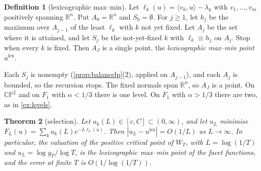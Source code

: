 \documentclass[11pt]{article}
\newtheorem{theorem}{Theorem}\newtheorem{proposition}[theorem]{Proposition}\newtheorem{lemma}[theorem]{Lemma}\newtheorem{corollary}[theorem]{Corollary}\newtheorem{conjecture}[theorem]{Conjecture}\crefname{conjecture}{Conjecture}{Conjectures}
\theoremstyle{definition}\newtheorem{definition}[theorem]{Definition}\newtheorem{remark}[theorem]{Remark}\newtheorem{example}[theorem]{Example}\newtheorem{problem}[theorem]{Open problem}\crefname{problem}{Problem}{Problems}
\newcommand{\R}{\mathbb R}
\begin{document}
\begin{definition}[lexicographic max--min]\label{def:lex}
Let $\ell_k(u)=\langle v_k,u\rangle-\lambda_k$ with $v_1,\dots,v_m$ positively spanning $\R^n$. Put $A_0=\R^n$ and $S_0=\emptyset$. For $j\ge1$, let $h_j$ be the maximum over $A_{j-1}$ of the least $\ell_k$ with $k$ not yet
fixed. Let $A_j$ be the set where it is attained, and let $S_j$ be the not-yet-fixed $k$ with $\ell_k\equiv h_j$ on $A_j$. Stop when every $k$ is fixed. Then $A_J$ is a single point, the
\emph{lexicographic max--min point} $u^{\mathrm{lex}}$.
\end{definition}

Each $S_j$ is nonempty (\cref{prop:balancelp}(2), applied on $A_{j-1}$), and each $A_j$ is bounded, so the recursion stops. The fixed normals span $\R^n$, so $A_J$ is a point. On $\mathbb{CP}^2$ and on $F_1$
with $\alpha<1/3$ there is one level. On $F_1$ with $\alpha>1/3$ there are two, as in \cref{ex:levels}.

\begin{theorem}[selection]\label{thm:selection}
Let $a_k(L)\in[c,C]\subset(0,\infty)$, and let $u_L$ minimise $F_L(u)=\sum_ka_k(L)e^{-L\ell_k(u)}$. Then $|u_L-u^{\mathrm{lex}}|=O(1/L)$ as $L\to\infty$. In particular, the valuation of the positive critical
point of $W_T$, with $L=\log(1/T)$ and $u_L=\log y_T/\log T$, is the lexicographic max--min point of the facet functions, and the error at finite $T$ is $O(1/\log(1/T))$.
\end{theorem}
\end{document}
